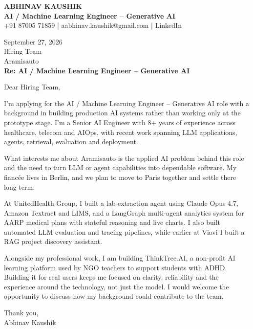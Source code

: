 \documentclass[10pt,a4paper]{article}
\begin{document}
\begin{center}
{\Large\bfseries ABHINAV KAUSHIK}\\[2pt]
{\bfseries AI / Machine Learning Engineer – Generative AI}\\[2pt]
+91 87005 71859 \quad | \quad aabhinav.kaushik@gmail.com \quad | \quad LinkedIn
\end{center}
\vspace{8pt}
September 27, 2026\\[6pt]
Hiring Team\\
Aramisauto\\[4pt]
\textbf{Re: AI / Machine Learning Engineer – Generative AI}

Dear Hiring Team,

I’m applying for the AI / Machine Learning Engineer – Generative AI role with a background in building production AI systems rather than working only at the prototype stage. I’m a Senior AI Engineer with 8+ years of experience across healthcare, telecom and AIOps, with recent work spanning LLM applications, agents, retrieval, evaluation and deployment.

What interests me about Aramisauto is the applied AI problem behind this role and the need to turn LLM or agent capabilities into dependable software. My fiancée lives in Berlin, and we plan to move to Paris together and settle there long term.

At UnitedHealth Group, I built a lab-extraction agent using Claude Opus 4.7, Amazon Textract and LIMS, and a LangGraph multi-agent analytics system for AARP medical plans with stateful reasoning and live charts. I also built automated LLM evaluation and tracing pipelines, while earlier at Viavi I built a RAG project discovery assistant.

Alongside my professional work, I am building ThinkTree.AI, a non-profit AI learning platform used by NGO teachers to support students with ADHD. Building it for real users keeps me focused on clarity, reliability and the experience around the technology, not just the model. I would welcome the opportunity to discuss how my background could contribute to the team.

Thank you,\\
Abhinav Kaushik
\end{document}
